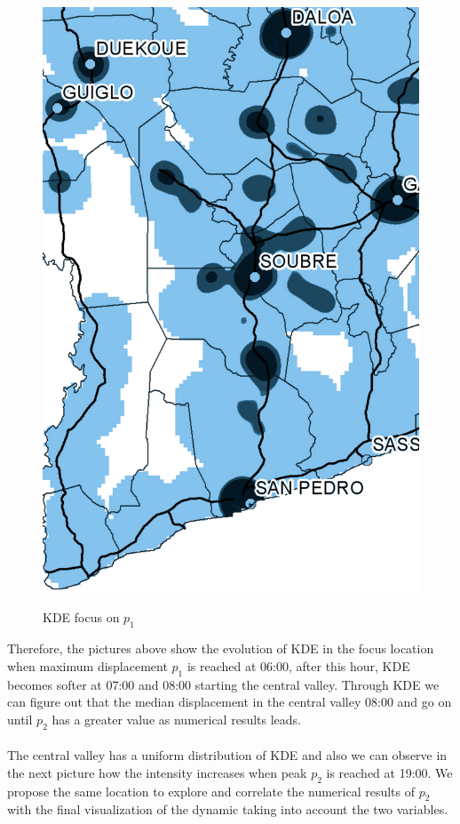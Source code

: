 \begin{figure}[h!]
{    \includegraphics[scale = 0.1]{results/images/kernel/l_hour8_kd_detail.pdf}
	\label{fig:subfig2_detail}
}
\caption[KDE focus on $p_1$]{KDE focus on $p_1$}
\label{fig:subfigureExample}
\end{figure}


Therefore, the pictures above show the evolution of KDE in the focus location when maximum displacement $p_1$ is reached at 06:00, after this hour, KDE becomes softer at 07:00 and 08:00 starting the central valley. Through KDE  we can figure out that the median displacement in the central valley 08:00 and go on until $p_2$ has a greater value as numerical results leads.
\\
\\
The central valley has a uniform distribution of KDE and also we can observe in the next picture how the intensity increases when peak $p_2$ is reached at 19:00. We propose the same location to explore and correlate the numerical results of $p_2$ with the final visualization of the dynamic taking into account the two variables.



